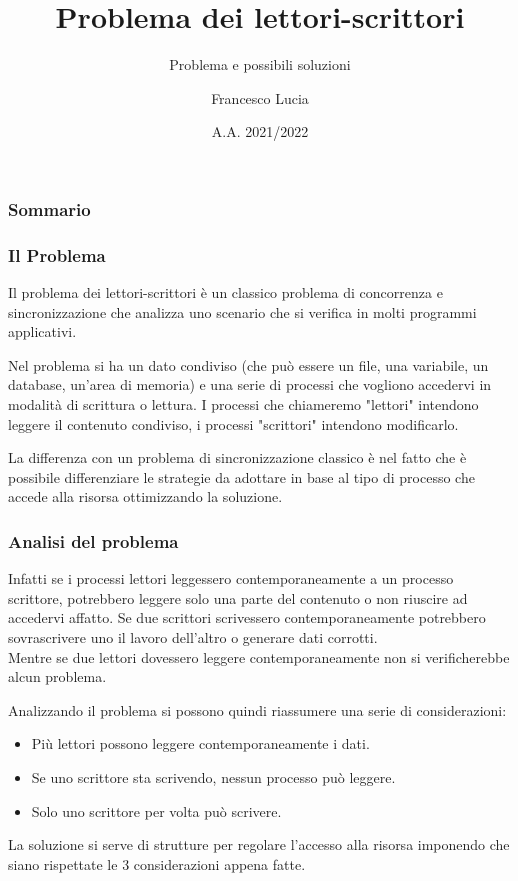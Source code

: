 \documentclass[10pt]{beamer}
\title[Lettori-Scrittori]{Problema dei lettori-scrittori}
\subtitle{Problema e possibili soluzioni}
\author{Francesco Lucia}
\institute[]
{
	Università degli studi della Basilicata \\
	\medskip
}
\date{A.A. 2021/2022}
\begin{document}
	
	\begin{frame}
		\titlepage
	\end{frame}
	
	\begin{frame}
		\frametitle{Sommario}
		\tableofcontents
	\end{frame}
	
	\begin{frame}
		\frametitle{Il Problema}
		
		Il problema dei lettori-scrittori è un classico problema di concorrenza e sincronizzazione che analizza uno scenario che si verifica in molti programmi applicativi.
		
		Nel problema si ha un dato condiviso (che può essere un file, una variabile, un database, un'area di memoria) e una serie di processi che vogliono accedervi in modalità di scrittura o lettura. I processi che chiameremo "lettori" intendono leggere il contenuto condiviso, i processi "scrittori" intendono modificarlo.
	
		La differenza con un problema di sincronizzazione classico è nel fatto che è possibile differenziare le strategie da adottare in base al tipo di processo che accede alla risorsa ottimizzando la soluzione.
	\end{frame}

\begin{frame}
	\frametitle{Analisi del problema}
	
	Infatti se i processi lettori leggessero contemporaneamente a un processo scrittore, potrebbero leggere solo una parte del contenuto o non riuscire ad accedervi affatto. Se due scrittori scrivessero contemporaneamente potrebbero sovrascrivere uno il lavoro dell'altro o generare dati corrotti.\\Mentre se due lettori dovessero leggere contemporaneamente non si verificherebbe alcun problema.
	
	Analizzando il problema si possono quindi riassumere una serie di considerazioni:
	
	\begin{itemize}
		\item Più lettori possono leggere contemporaneamente i dati.
		\item Se uno scrittore sta scrivendo, nessun processo può leggere.
		\item Solo uno scrittore per volta può scrivere.
	\end{itemize}

	La soluzione si serve di strutture per regolare l'accesso alla risorsa imponendo che siano rispettate le 3 considerazioni appena fatte.
\end{frame}
\end{document}

